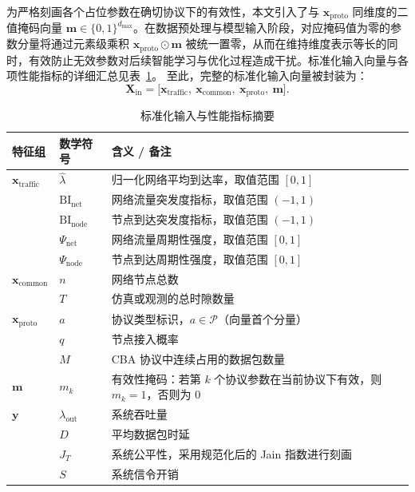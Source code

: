 为严格刻画各个占位参数在确切协议下的有效性，本文引入了与 $\mathbf{x}_{\mathrm{proto}}$ 同维度的二值掩码向量 $\mathbf{m} \in \{0,1\}^{d_{\max}}$。在数据预处理与模型输入阶段，对应掩码值为零的参数分量将通过元素级乘积 $\mathbf{x}_{\mathrm{proto}} \odot \mathbf{m}$ 被统一置零，从而在维持维度表示等长的同时，有效防止无效参数对后续智能学习与优化过程造成干扰。标准化输入向量与各项性能指标的详细汇总见表~\ref{tab:input_features}。
至此，完整的标准化输入向量被封装为：
\begin{equation}
\mathbf{X}_{\mathrm{in}} = \big[\mathbf{x}_{\text{traffic}},\ \mathbf{x}_{\mathrm{common}},\ \mathbf{x}_{\mathrm{proto}},\ \mathbf{m}\big].
\end{equation}

\begin{table}[t]
	\centering
	\caption{标准化输入与性能指标摘要}
	\label{tab:input_features}
	\renewcommand{\arraystretch}{1.2}
	\begin{tabular}{llp{9cm}}
	\toprule
		\textbf{特征组} & \textbf{数学符号} & \textbf{含义 / 备注} \\
		\midrule
		$\mathbf{x}_{\text{traffic}}$ & $\hat{\lambda}$ & 归一化网络平均到达率，取值范围 $[0, 1]$ \\
		& $\mathrm{BI}_{\mathrm{net}}$ & 网络流量突发度指标，取值范围 $(-1,1)$ \\
		& $\mathrm{BI}_{\mathrm{node}}$ & 节点到达突发度指标，取值范围 $(-1,1)$ \\
		& $\Psi_{\mathrm{net}}$ & 网络流量周期性强度，取值范围 $[0,1]$ \\
		& $\Psi_{\mathrm{node}}$ & 节点到达周期性强度，取值范围 $[0,1]$ \\
		\midrule
		$\mathbf{x}_{\mathrm{common}}$ & $n$ & 网络节点总数 \\
		& $T$ & 仿真或观测的总时隙数量 \\
		\midrule
		$\mathbf{x}_{\mathrm{proto}}$ & $a$ & 协议类型标识，$a\in\mathcal{P}$（向量首个分量） \\
		& $q$ & 节点接入概率 \\
		& $M$ & CBA 协议中连续占用的数据包数量 \\
		\midrule
		$\mathbf{m}$ & $m_k$ & 有效性掩码：若第 $k$ 个协议参数在当前协议下有效，则 $m_k=1$，否则为 $0$ \\
		\midrule
		$\mathbf{y}$ & $\lambda_{\mathrm{out}}$ & 系统吞吐量 \\
		& $D$ & 平均数据包时延 \\
		& $J_T$ & 系统公平性，采用规范化后的 Jain 指数进行刻画 \\
		& $S$ & 系统信令开销 \\
		\bottomrule
	\end{tabular}
\end{table}

